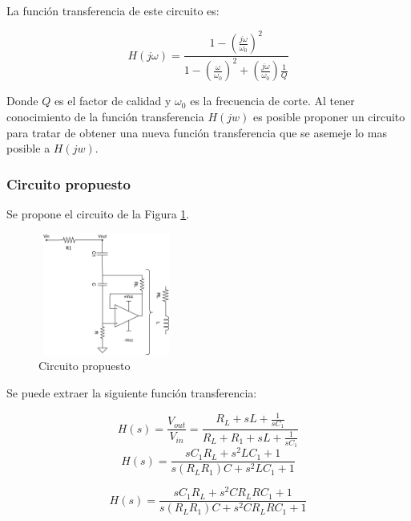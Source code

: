 La función transferencia de este circuito es:

\begin{equation} H(j\omega) = \frac{1-(\frac{j\omega}{\omega_0})^2}{1 - (\frac{\omega}{\omega_0})^{2} + (\frac{j\omega}{\omega_0})\frac{1}{Q}} \label{equ:trans_clasica_br}\end{equation}  

Donde $Q$ es el factor de calidad y $\omega_0$ es la frecuencia de corte.      
Al tener conocimiento de la función transferencia $H(jw)$ es posible proponer un circuito para tratar de obtener una nueva función transferencia que se asemeje lo mas posible a $H(jw)$. 

\subsubsection{Circuito propuesto}
Se propone el circuito de la Figura \ref{fig:ej2_BR_propuesto}. 

\begin{figure}[!]                                                       
\centering\includegraphics[width=0.4\textwidth, height=4cm]{../Ex2/Resources/ej2_br_gyrator.png}
\caption{Circuito propuesto}
\label{fig:ej2_BR_propuesto}
\end{figure}

Se puede extraer la siguiente función transferencia:

\begin{displaymath} H(s)= \frac{V_{out}}{V_{in}} = \frac{R_L + sL + \frac{1}{sC_1}}{R_L + R_1 +sL + \frac{1}{sC_1}} \end{displaymath}  
\begin{displaymath} H(s)= \frac{sC_1R_L + s^2LC_1 + 1}{s (R_L R_1)C + s^2LC_1 + 1} \end{displaymath}

\begin{displaymath} H(s)= \frac{sC_1R_L + s^2CR_LRC_1 + 1}{s (R_L R_1)C+ s^2CR_LRC_1 + 1} \end{displaymath}





